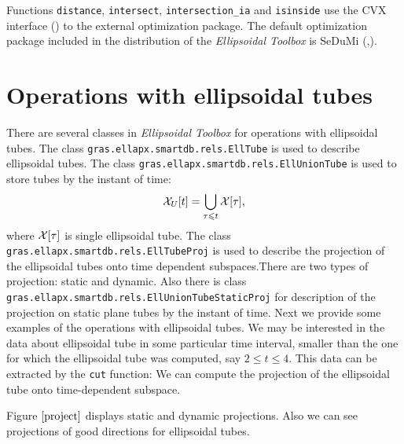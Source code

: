 Functions {\tt distance}, {\tt intersect}, {\tt intersection\_ia} and
{\tt isinside} use the CVX interface (\cite{CVX_HOMEPAGE}) to the
external optimization package. The default optimization package included
in the distribution of the {\it Ellipsoidal Toolbox} is SeDuMi
(\cite{STURM_USING_SEDUMI},\cite{SEDUMI_HOMEPAGE}).
\section{Operations with ellipsoidal tubes}
There are several classes in {\it Ellipsoidal Toolbox} for operations with ellipsoidal tubes. The class {\tt gras.ellapx.smartdb.rels.EllTube} is used
to describe ellipsoidal tubes. The class {\tt gras.ellapx.smartdb.rels.EllUnionTube} is used to store tubes by the instant of time:
$$
\XX_{U}[t]=\bigcup \limits_{\tau\leq t}\XX[\tau],
$$
where $\XX[\tau]$ is single ellipsoidal tube.
\newline
The class {\tt gras.ellapx.smartdb.rels.EllTubeProj} is used to describe the projection of the ellipsoidal tubes onto time dependent subspaces.There are two types of projection: static and dynamic.
Also there is class {\tt gras.ellapx.smartdb.rels.EllUnionTubeStaticProj} for description of the projection on static plane tubes by the instant of time.
\newline
Next we provide some examples of the operations with ellipsoidal tubes.
We may be interested in the data about ellipsoidal tube in some
particular time interval, smaller than the one for which the ellipsoidal tube was
computed, say $2\leq t\leq4$.
This data can be extracted  by the {\tt cut} function:
We can compute the projection of the ellipsoidal tube onto time-dependent subspace.

Figure $\ref{project}$ displays static and dynamic projections. Also we can see projections of good directions for
ellipsoidal tubes.

